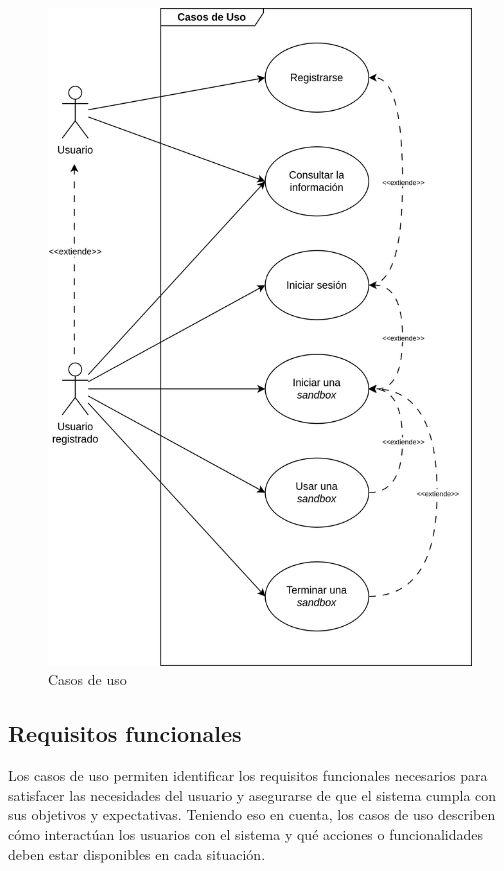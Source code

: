            \begin{figure}[h]
                \centering
                \includegraphics[scale=0.125]{images/Diagramas/Casos de uso.png}
                \caption{Casos de uso}
                \label{fig:casos-uso}
            \end{figure}
            
            \newpage
        
        
        \subsection{Requisitos funcionales}
            \label{sec:requisitos-funcionales}
            
            Los casos de uso permiten identificar los requisitos funcionales necesarios para satisfacer las necesidades del usuario y asegurarse de que el sistema cumpla con sus objetivos y expectativas. Teniendo eso en cuenta, los casos de uso describen cómo interactúan los usuarios con el sistema y qué acciones o funcionalidades deben estar disponibles en cada situación.
            
